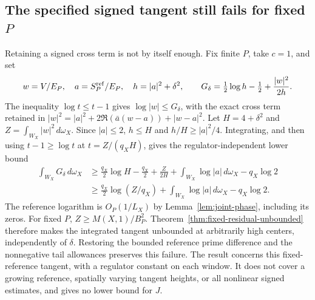 \subsection{The specified signed tangent still fails for fixed \(P\)}
Retaining a signed cross term is not by itself enough. Fix finite
\(P\), take \(c=1\), and set
\[
 w=V/E_P,\quad a=S_P^{\rm ref}/E_P,\quad h=|a|^2+\delta^2,
 \qquad G_\delta=\tfrac12\log h-\tfrac12+\frac{|w|^2}{2h}.
\]
The inequality \(\log t\le t-1\) gives \(\log|w|\le G_\delta\),
with the exact cross term retained in
\(|w|^2=|a|^2+2\Re(\bar a(w-a))+|w-a|^2\).
Let \(H=4+\delta^2\) and \(Z=\int_{W_X}|w|^2\,d\omega_X\).
Since \(|a|\le2\), \(h\le H\) and \(h/H\ge|a|^2/4\).
Integrating, and then using \(t-1\ge\log t\) at \(t=Z/(q_XH)\),
gives the regulator-independent lower bound
\begin{align}\label{eq:tangent-obstruction}
 \int_{W_X}G_\delta\,d\omega_X
 &\ge\frac{q_X}{2}\log H-\frac{q_X}{2}+\frac Z{2H}
         +\int_{W_X}\log|a|\,d\omega_X-q_X\log2\nonumber\\
 &\ge\frac{q_X}{2}\log(Z/q_X)
         +\int_{W_X}\log|a|\,d\omega_X-q_X\log2.
\end{align}
The reference logarithm is \(O_P(1/L_X)\) by
Lemma~\ref{lem:joint-phase}, including its zeros. For fixed \(P\),
\(Z\ge M(X,1)/B_P^2\). Theorem~\ref{thm:fixed-residual-unbounded}
therefore makes the integrated tangent unbounded at arbitrarily high
centers, independently of \(\delta\). Restoring the bounded reference
prime difference and the nonnegative tail allowances preserves this
failure. The result concerns this fixed-reference tangent, with a
regulator constant on each window. It does not cover a growing
reference, spatially varying tangent heights, or all nonlinear signed
estimates, and gives no lower bound for \(J\).
